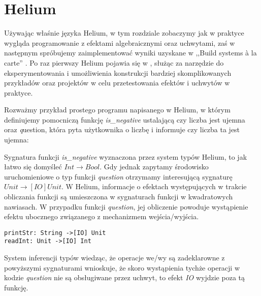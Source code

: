 \section{Helium}


Używając właśnie języka Helium, w tym rozdziale zobaczymy jak w praktyce wygląda programowanie z efektami algebraicznymi oraz uchwytami, zaś w następnym spróbujemy zaimplementować wyniki uzyskane w ,,Build systems {\`a} la carte'' \cite{mokhov2018build, mokhov2020build}. Po raz pierwszy Helium pojawia się w \cite{biernacki2019abstracting}, służąc za narzędzie do eksperymentowania i umożliwienia konstrukcji bardziej skomplikowanych przykładów oraz projektów w celu przetestowania efektów i uchwytów w praktyce.

Rozważmy przykład prostego programu napisanego w Helium, w którym definiujemy pomocniczą funkcję \textit{is\_negative} ustalającą czy liczba jest ujemna oraz {\textit question}, która pyta użytkownika o liczbę i informuje czy liczba ta jest ujemna:



Sygnatura funkcji \textit{is\_negative} wyznaczona przez system typów Helium, to jak łatwo się domyśleć \(\mathit{Int \rightarrow Bool}\). Gdy jednak zapytamy środowisko uruchomieniowe o typ funkcji \textit{question} otrzymamy interesującą sygnaturę \(\mathit{Unit \rightarrow[IO] Unit}\). W Helium, informacje o efektach występujących w trakcie obliczania funkcji są umieszczona w sygnaturach funkcji w kwadratowych nawiasach. W przypadku funkcji \textit{question}, jej obliczenie powoduje wystąpienie efektu ubocznego związanego z mechanizmem wejścia/wyjścia. 

\lstset{style=helium}
\begin{minipage}{\linewidth}\begin{lstlisting}
printStr: String ->[IO] Unit
readInt: Unit ->[IO] Int
\end{lstlisting}\end{minipage}

System inferencji typów wiedząc, że operacje we/wy są zadeklarowne z powyższymi sygnaturami wnioskuje, że skoro wystąpienia tychże operacji w kodzie \textit{question} nie są obsługiwane przez uchwyt, to efekt \textit{IO} wyjdzie poza tą funkcję.

